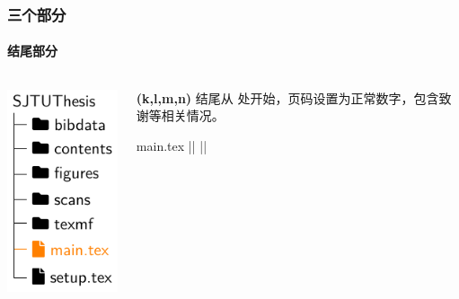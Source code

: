 \begin{frame}[fragile]
  \frametitle{三个部分}
  \framesubtitle{结尾部分}
  \begin{columns}
    \begin{column}{0.4\textwidth}
      \includegraphics[page=10]{support/figures/thesisdir.pdf}
    \end{column}
    \begin{column}{0.6\textwidth}
      \alert{\textbf{(k,l,m,n)}} 结尾从  处开始，页码设置为正常数字，包含致谢等相关情况。
      \begin{codeblock}[firstnumber=71]{main.tex}
|\highlightline|%
|\highlightline|\backmatter






      \end{codeblock}
    \end{column}
  \end{columns}
\end{frame}

